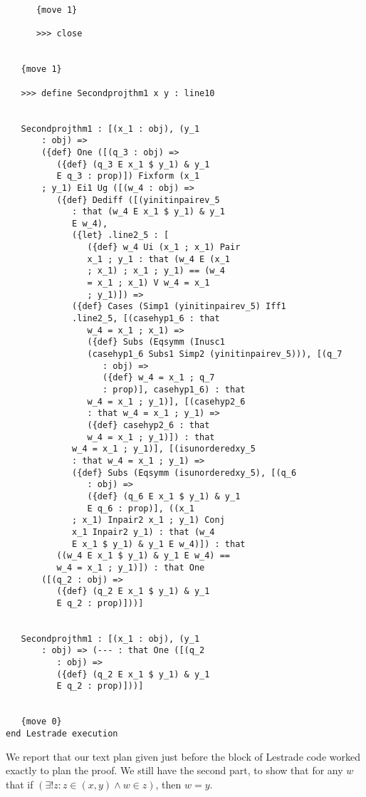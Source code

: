 \documentclass[12pt]{article}
\begin{document}
\begin{verbatim}
      {move 1}

      >>> close


   {move 1}

   >>> define Secondprojthm1 x y : line10


   Secondprojthm1 : [(x_1 : obj), (y_1 
       : obj) => 
       ({def} One ([(q_3 : obj) => 
          ({def} (q_3 E x_1 $ y_1) & y_1 
          E q_3 : prop)]) Fixform (x_1 
       ; y_1) Ei1 Ug ([(w_4 : obj) => 
          ({def} Dediff ([(yinitinpairev_5 
             : that (w_4 E x_1 $ y_1) & y_1 
             E w_4), 
             ({let} .line2_5 : [
                ({def} w_4 Ui (x_1 ; x_1) Pair 
                x_1 ; y_1 : that (w_4 E (x_1 
                ; x_1) ; x_1 ; y_1) == (w_4 
                = x_1 ; x_1) V w_4 = x_1 
                ; y_1)]) => 
             ({def} Cases (Simp1 (yinitinpairev_5) Iff1 
             .line2_5, [(casehyp1_6 : that 
                w_4 = x_1 ; x_1) => 
                ({def} Subs (Eqsymm (Inusc1 
                (casehyp1_6 Subs1 Simp2 (yinitinpairev_5))), [(q_7 
                   : obj) => 
                   ({def} w_4 = x_1 ; q_7 
                   : prop)], casehyp1_6) : that 
                w_4 = x_1 ; y_1)], [(casehyp2_6 
                : that w_4 = x_1 ; y_1) => 
                ({def} casehyp2_6 : that 
                w_4 = x_1 ; y_1)]) : that 
             w_4 = x_1 ; y_1)], [(isunorderedxy_5 
             : that w_4 = x_1 ; y_1) => 
             ({def} Subs (Eqsymm (isunorderedxy_5), [(q_6 
                : obj) => 
                ({def} (q_6 E x_1 $ y_1) & y_1 
                E q_6 : prop)], ((x_1 
             ; x_1) Inpair2 x_1 ; y_1) Conj 
             x_1 Inpair2 y_1) : that (w_4 
             E x_1 $ y_1) & y_1 E w_4)]) : that 
          ((w_4 E x_1 $ y_1) & y_1 E w_4) == 
          w_4 = x_1 ; y_1)]) : that One 
       ([(q_2 : obj) => 
          ({def} (q_2 E x_1 $ y_1) & y_1 
          E q_2 : prop)]))]


   Secondprojthm1 : [(x_1 : obj), (y_1 
       : obj) => (--- : that One ([(q_2 
          : obj) => 
          ({def} (q_2 E x_1 $ y_1) & y_1 
          E q_2 : prop)]))]


   {move 0}
end Lestrade execution
\end{verbatim}

We report that our text plan given just before the block of Lestrade code worked exactly to plan the proof.  We still have the second part, to show that for any $w$ that if $(\exists! z: z \in (x,y) \wedge w \in z)$, then $w=y$.
\end{document}
